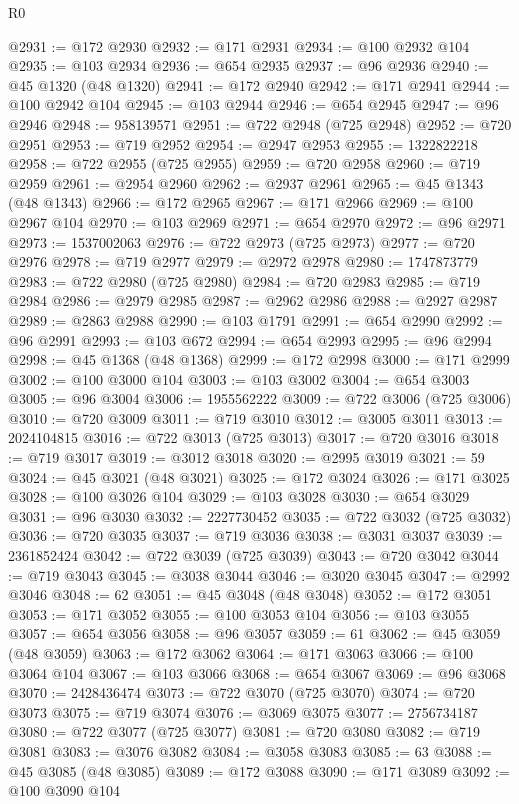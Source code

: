 \begin{lexlean}{R0}
\begin{coremodule}
@2931 := @172 @2930
@2932 := @171 @2931
@2934 := @100 @2932 @104
@2935 := @103 @2934
@2936 := @654 @2935
@2937 := @96 @2936
@2940 := @45 @1320 (@48 @1320)
@2941 := @172 @2940
@2942 := @171 @2941
@2944 := @100 @2942 @104
@2945 := @103 @2944
@2946 := @654 @2945
@2947 := @96 @2946
@2948 := 958139571
@2951 := @722 @2948 (@725 @2948)
@2952 := @720 @2951
@2953 := @719 @2952
@2954 := @2947 @2953
@2955 := 1322822218
@2958 := @722 @2955 (@725 @2955)
@2959 := @720 @2958
@2960 := @719 @2959
@2961 := @2954 @2960
@2962 := @2937 @2961
@2965 := @45 @1343 (@48 @1343)
@2966 := @172 @2965
@2967 := @171 @2966
@2969 := @100 @2967 @104
@2970 := @103 @2969
@2971 := @654 @2970
@2972 := @96 @2971
@2973 := 1537002063
@2976 := @722 @2973 (@725 @2973)
@2977 := @720 @2976
@2978 := @719 @2977
@2979 := @2972 @2978
@2980 := 1747873779
@2983 := @722 @2980 (@725 @2980)
@2984 := @720 @2983
@2985 := @719 @2984
@2986 := @2979 @2985
@2987 := @2962 @2986
@2988 := @2927 @2987
@2989 := @2863 @2988
@2990 := @103 @1791
@2991 := @654 @2990
@2992 := @96 @2991
@2993 := @103 @672
@2994 := @654 @2993
@2995 := @96 @2994
@2998 := @45 @1368 (@48 @1368)
@2999 := @172 @2998
@3000 := @171 @2999
@3002 := @100 @3000 @104
@3003 := @103 @3002
@3004 := @654 @3003
@3005 := @96 @3004
@3006 := 1955562222
@3009 := @722 @3006 (@725 @3006)
@3010 := @720 @3009
@3011 := @719 @3010
@3012 := @3005 @3011
@3013 := 2024104815
@3016 := @722 @3013 (@725 @3013)
@3017 := @720 @3016
@3018 := @719 @3017
@3019 := @3012 @3018
@3020 := @2995 @3019
@3021 := 59
@3024 := @45 @3021 (@48 @3021)
@3025 := @172 @3024
@3026 := @171 @3025
@3028 := @100 @3026 @104
@3029 := @103 @3028
@3030 := @654 @3029
@3031 := @96 @3030
@3032 := 2227730452
@3035 := @722 @3032 (@725 @3032)
@3036 := @720 @3035
@3037 := @719 @3036
@3038 := @3031 @3037
@3039 := 2361852424
@3042 := @722 @3039 (@725 @3039)
@3043 := @720 @3042
@3044 := @719 @3043
@3045 := @3038 @3044
@3046 := @3020 @3045
@3047 := @2992 @3046
@3048 := 62
@3051 := @45 @3048 (@48 @3048)
@3052 := @172 @3051
@3053 := @171 @3052
@3055 := @100 @3053 @104
@3056 := @103 @3055
@3057 := @654 @3056
@3058 := @96 @3057
@3059 := 61
@3062 := @45 @3059 (@48 @3059)
@3063 := @172 @3062
@3064 := @171 @3063
@3066 := @100 @3064 @104
@3067 := @103 @3066
@3068 := @654 @3067
@3069 := @96 @3068
@3070 := 2428436474
@3073 := @722 @3070 (@725 @3070)
@3074 := @720 @3073
@3075 := @719 @3074
@3076 := @3069 @3075
@3077 := 2756734187
@3080 := @722 @3077 (@725 @3077)
@3081 := @720 @3080
@3082 := @719 @3081
@3083 := @3076 @3082
@3084 := @3058 @3083
@3085 := 63
@3088 := @45 @3085 (@48 @3085)
@3089 := @172 @3088
@3090 := @171 @3089
@3092 := @100 @3090 @104

\end{coremodule}
\end{lexlean}
